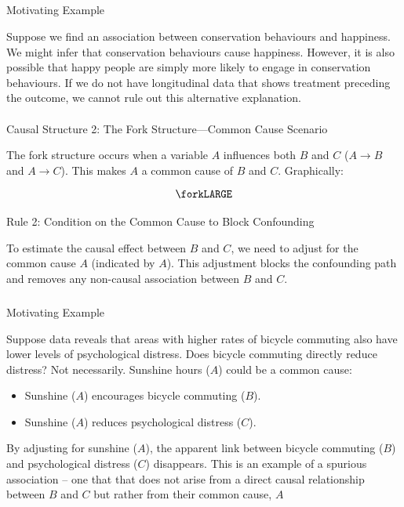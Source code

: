 \documentclass[
  singlecolumn]{article}
\makeatletter
\let\oldparagraph\paragraph
\renewcommand{\paragraph}{
    \@ifstar
      \xxxParagraphStar
      \xxxParagraphNoStar
  }
\newcommand{\xxxParagraphStar}[1]{\oldparagraph*{#1}\mbox{}}
\newcommand{\xxxParagraphNoStar}[1]{\oldparagraph{#1}\mbox{}}
\let\oldsubparagraph\subparagraph
\renewcommand{\subparagraph}{
    \@ifstar
      \xxxSubParagraphStar
      \xxxSubParagraphNoStar
  }
\newcommand{\xxxSubParagraphStar}[1]{\oldsubparagraph*{#1}\mbox{}}
\newcommand{\xxxSubParagraphNoStar}[1]{\oldsubparagraph{#1}\mbox{}}
\providecommand{\tightlist}{%
  \setlength{\itemsep}{0pt}\setlength{\parskip}{0pt}}\usepackage{longtable,booktabs,array}
\makeatother
\begin{document}
\subparagraph{Motivating Example}\label{motivating-example}

Suppose we find an association between conservation behaviours and
happiness. We might infer that conservation behaviours cause happiness.
However, it is also possible that happy people are simply more likely to
engage in conservation behaviours. If we do not have longitudinal data
that shows treatment preceding the outcome, we cannot rule out this
alternative explanation.

\paragraph{Causal Structure 2: The Fork Structure---Common Cause
Scenario}\label{causal-structure-2-the-fork-structurecommon-cause-scenario}

The fork structure occurs when a variable \(A\) influences both \(B\)
and \(C\) (\(A \rightarrow B\) and \(A \rightarrow C\)). This makes
\(A\) a common cause of \(B\) and \(C\). Graphically:

\[
\forkLARGE
\]

\paragraph{Rule 2: Condition on the Common Cause to Block
Confounding}\label{rule-2-condition-on-the-common-cause-to-block-confounding}

To estimate the causal effect between \(B\) and \(C\), we need to adjust
for the common cause \(A\) (indicated by \(\boxed{A}\)). This adjustment
blocks the confounding path and removes any non-causal association
between \(B\) and \(C\).

\subparagraph{Motivating Example}\label{motivating-example-1}

Suppose data reveals that areas with higher rates of bicycle commuting
also have lower levels of psychological distress. Does bicycle commuting
directly reduce distress? Not necessarily. Sunshine hours (\(A\)) could
be a common cause:

\begin{itemize}
\tightlist
\item
  Sunshine (\(A\)) encourages bicycle commuting (\(B\)).
\item
  Sunshine (\(A\)) reduces psychological distress (\(C\)).
\end{itemize}

By adjusting for sunshine (\(\boxed{A}\)), the apparent link between
bicycle commuting (\(B\)) and psychological distress (\(C\)) disappears.
This is an example of a spurious association -- one that that does not
arise from a direct causal relationship between \(B\) and \(C\) but
rather from their common cause, \(A\)
\end{document}
